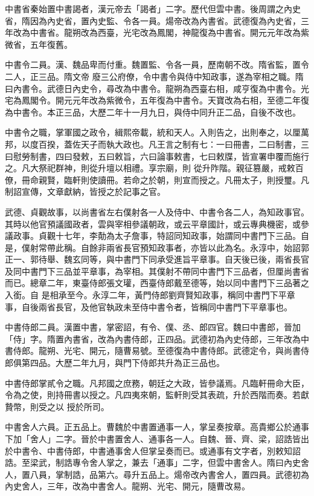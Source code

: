 \begin{pinyinscope}
 中書省秦始置中書謁者，漢元帝去「謁者」二字。歷代但雲中書。後周謂之內史省，隋因為內史省，置內史監、令各一員。煬帝改為內書省。武德復為內史省，三年改為中書省。龍朔改為西臺，光宅改為鳳閣，神龍復為中書省。開元元年改為紫微省，五年復舊。



 中書令二員。漢、魏品卑而付重。魏置監、令各一員，歷南朝不改。隋省監，置令二人，正三品。隋文帝
 廢三公府僚，令中書令與侍中知政事，遂為宰相之職。隋曰內書令。武德日內史令，尋改為中書令。龍朔為西臺右相，咸亨復為中書令。光宅為鳳閣令。開元元年改為紫微令，五年復為中書令。天寶改為右相，至德二年復為中書令。本正三品，大歷二年十一月九日，與侍中同升正二品，自後不改也。



 中書令之職，掌軍國之政令，緝熙帝載，統和天人。入則告之，出則奉之，以厘萬邦，以度百揆，蓋佐天子而執大政也。凡王言之制有七：一曰冊書，二曰制書，三曰慰勞制書，四曰發敕，五曰敕旨，六曰論事敕書，七曰敕牒，皆宣署申覆而施行之。凡大祭祀群神，則從升壇以相禮。享宗廟，則
 從升阼階。親征篡嚴，戒敕百僚，冊命親賢，臨軒則使讀冊。若命之於朝，則宣而授之。凡冊太子，則授璽。凡制詔宣傳，文章獻納，皆授之於記事之官。



 武德、貞觀故事，以尚書省左右僕射各一人及侍中、中書令各二人，為知政事官。其時以他官預議國政者，雲與宰相參議朝政，或云平章國計，或云專典機密，或參議政事。貞觀十七年，李勣為太子詹事，特詔同知政事，始謂同中書門下三品。自是，僕射常帶此稱。自餘非兩省長官預知政事者，亦皆以此為名。永淳中，始詔郭正一、郭待舉、魏玄同等，與中書門下同承受進旨平章事。自天後已後，兩省長官及同中書門下三品並平章事，為宰相。其僕射不帶同中書門下三品者，但厘尚書省而已。總章二年，東臺侍郎張文瓘，西臺侍郎戴至德等，始以同中書門下三品著之入銜。自
 是相承至今。永淳二年，黃門侍郎劉齊賢知政事，稱同中書門下平章事，自後兩省長官，及他官執政未至侍中書令者，皆稱同中書門下平章事也。



 中書侍郎二員。漢置中書，掌密詔，有令、僕、丞、郎四官。魏曰中書郎，晉加「侍」字。隋置內書省，改為內書侍郎，正四品。武德初為內史侍郎，三年改為中書侍郎。龍朔、光宅、開元，隨曹易號。至德復為中書侍郎。武德定令，與尚書侍郎俱第四品。大歷二年九月，與門下侍郎共升為正三品也。



 中書侍郎掌貳令之職。凡邦國之庶務，朝廷之大政，皆參議焉。凡臨軒冊命大臣，令為之使，則持冊書以授之。凡四夷來朝，監軒則受其表疏，升於西階而奏。若獻贄幣，則受之以
 授於所司。



 中書舍人六員。正五品上。曹魏於中書置通事一人，掌呈奏按章。高貴鄉公於通事下加「舍人」二字。晉於中書置舍人、通事各一人。自魏、晉、齊、梁，詔誥皆出於中書令、中書侍郎，中書通事舍人但掌呈奏而已。或通事有文字者，別敕知詔誥。至梁武，制誥專令舍人掌之，兼去「通事」二字，但雲中書舍人。隋曰內史舍人，置八員，掌制誥，品第六。尋升五品上。煬帝改內書舍人，置四員。武德初為內史舍人，三年，改為中書舍人。龍朔、光宅、開元，隨曹改易。




\end{pinyinscope}
